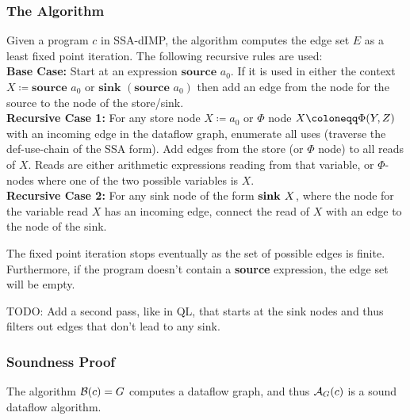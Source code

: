 \subsubsection*{The Algorithm}
Given a program $c$ in SSA-dIMP, the algorithm computes
the edge set $E$ as a least fixed point iteration.
The following recursive rules are used:\\
\textbf{Base Case:} Start at an expression $\textbf{source }a_0$.
If it is used in either the context $X \coloneqq \textbf{source }a_0$
or $\textbf{sink }(\textbf{source }a_0)$ then add an edge from the node for the
source to the node of the store/sink.\\
\textbf{Recursive Case 1:} For any store node $X \coloneqq a_0$ or
$\Phi$ node $\phistore{X}{Y}{Z}$ with an incoming edge
in the dataflow graph, enumerate all uses (traverse
the def-use-chain of the SSA form). Add edges from the store (or $\Phi$ node)
to all reads of $X$.
Reads are either arithmetic expressions reading from that variable,
or $\Phi$-nodes where one of the two possible variables is $X$.\\
\textbf{Recursive Case 2:} For any sink node of the form $\textbf{sink }{X}$,
where the node for the variable read $X$ has an incoming edge, connect 
the read of $X$ with an edge to the node of the sink.

The fixed point iteration stops eventually as the set of possible edges is
finite. Furthermore, if the program doesn't contain a \textbf{source} expression,
the edge set will be empty.

TODO: Add a second pass, like in QL, that starts at the sink nodes and thus
filters out edges that don't lead to any sink.

\subsubsection*{Soundness Proof}
\begin{theorem}
    \label{thm:df-soundness}
    The algorithm $\operatorname{\mathcal{B}}(c) = G$ computes a dataflow graph, and thus 
    $\operatorname{\mathcal{A}}_G(c)$ is a sound dataflow algorithm.
\end{theorem}

